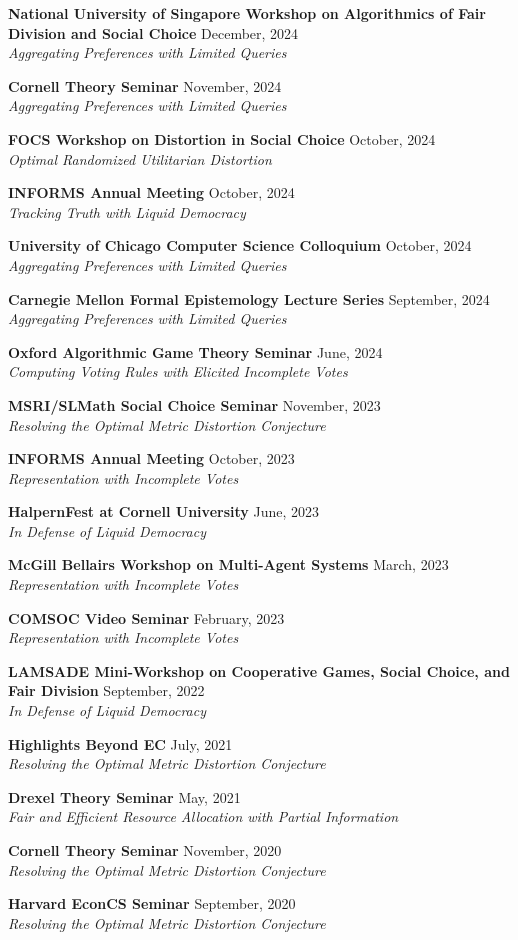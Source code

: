 \documentclass{article}
\newcommand{\talk}[3]{\needspace{2\baselineskip}\textbf{#1} \hfill #2 \\\textit{#3}}
\begin{document}
\talk{National University of Singapore Workshop on Algorithmics of Fair Division and Social Choice}{December, 2024}{Aggregating Preferences with Limited Queries}

\talk{Cornell Theory Seminar}{November, 2024}{Aggregating Preferences with Limited Queries}

\talk{FOCS Workshop on Distortion in Social Choice}{October, 2024}{Optimal Randomized Utilitarian Distortion}

\talk{INFORMS Annual Meeting}{October, 2024}{Tracking Truth with Liquid Democracy}

\talk{University of Chicago Computer Science Colloquium}{October, 2024}{Aggregating Preferences with Limited Queries}

\talk{Carnegie Mellon Formal Epistemology Lecture Series}{September, 2024}{Aggregating Preferences with Limited Queries}

\talk{Oxford Algorithmic Game Theory Seminar}{June, 2024}{Computing Voting Rules with Elicited Incomplete Votes}

\talk{MSRI/SLMath Social Choice Seminar}{November, 2023}{Resolving the Optimal Metric Distortion Conjecture}

\talk{INFORMS Annual Meeting}{October, 2023}{Representation with Incomplete Votes}

\talk{HalpernFest at Cornell University}{June, 2023}{In Defense of Liquid Democracy}

\talk{McGill Bellairs Workshop on Multi-Agent Systems}{March, 2023}{Representation with Incomplete Votes}

\talk{COMSOC Video Seminar}{February, 2023}{Representation with Incomplete Votes}

\talk{LAMSADE Mini-Workshop on Cooperative Games, Social Choice, and Fair Division}{September, 2022}{In Defense of Liquid Democracy}

\talk{Highlights Beyond EC}{July, 2021}{Resolving the Optimal Metric Distortion Conjecture}

\talk{Drexel Theory Seminar}{May, 2021}{Fair and Efficient Resource Allocation with Partial Information}

\talk{Cornell Theory Seminar}{November, 2020}{Resolving the Optimal Metric Distortion Conjecture}

\talk{Harvard EconCS Seminar}{September, 2020}{Resolving the Optimal Metric Distortion Conjecture}
\end{document}
